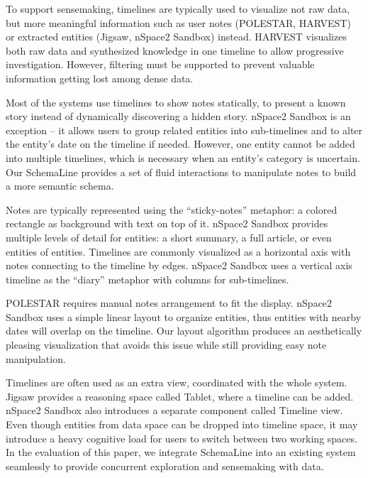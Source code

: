 To support sensemaking, timelines are typically used to visualize not raw data, but more meaningful information such as user notes (POLESTAR, HARVEST) or extracted entities (Jigsaw, nSpace2 Sandbox) instead. HARVEST visualizes both raw data and synthesized knowledge in one timeline to allow progressive investigation. However, filtering must be supported to prevent valuable information getting lost among dense data.

Most of the systems use timelines to show notes statically, to present a known story instead of dynamically discovering a hidden story. nSpace2 Sandbox is an exception -- it allows users to group related entities into sub-timelines and to alter the entity's date on the timeline if needed. However, one entity cannot be added into multiple timelines, which is necessary when an entity's category is uncertain. Our SchemaLine provides a set of fluid interactions to manipulate notes to build a more semantic schema.

Notes are typically represented using the ``sticky-notes'' metaphor: a colored rectangle as background with text on top of it. nSpace2 Sandbox provides multiple levels of detail for entities: a short summary, a full article, or even entities of entities. Timelines are commonly visualized as a horizontal axis with notes connecting to the timeline by edges. nSpace2 Sandbox uses a vertical axis timeline as the ``diary'' metaphor with columns for sub-timelines.

POLESTAR requires manual notes arrangement to fit the display. nSpace2 Sandbox uses a simple linear layout to organize entities, thus entities with nearby dates will overlap on the timeline. Our layout algorithm produces an aesthetically pleasing visualization that avoids this issue while still providing easy note manipulation.

Timelines are often used as an extra view, coordinated with the whole system. Jigsaw provides a reasoning space called Tablet, where a timeline can be added. nSpace2 Sandbox also introduces a separate component called Timeline view. Even though entities from data space can be dropped into timeline space, it may introduce a heavy cognitive load for users to switch between two working spaces. In the evaluation of this paper, we integrate SchemaLine into an existing system seamlessly to provide concurrent exploration and sensemaking with data.

